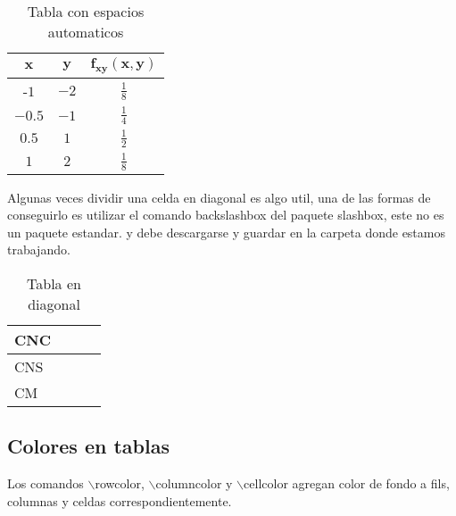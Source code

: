 \documentclass{article}
\begin{document}
	\renewcommand{\arrayrulewidth}{1pt}


	\begin{wraptable}[10]{L}[5mm]{0.4\textwidth}
		
		\centering
		\begin{tabular}{ccc}	%
			$\mathbf{x}$ & $\mathbf{y}$ & $\mathbf{f_{xy}(x,y)}$\\
			\hline %
			-$1$ & $-2$ & $\frac{1}{8}$\\
			$-0.5$ & $-1$ & $\frac{1}{4}$\\
			$0.5$ & $1$ & $\frac{1}{2}$ \\
			$1$ & $2$ & $\frac{1}{8}$\\
			\hline  
		\end{tabular}
		\caption{Tabla con espacios automaticos}
	\end{wraptable}
	\lipsum[2-1]
	Algunas veces dividir una celda en diagonal es algo util, una de las formas de conseguirlo es utilizar el comando \textcolor{myGreen}{backslashbox} del paquete \textcolor{myGreen}{slashbox}, este no es un paquete estandar. y debe descargarse y guardar en la carpeta donde estamos trabajando.

	\begin{table}[ht]
		\centering
		\begin{tabular}{|l||c|c|c|}
		\hline
		\hline \hline
		CNC & & & \\
		\hline
		CNS & & & \\
		\hline
		CM & & & \\
		\hline
		\end{tabular}
		\caption{Tabla en diagonal}
	\end{table}
	
	\subsection{Colores en tablas}
	Los comandos \textcolor{myGreen}{$\backslash$rowcolor}, \textcolor{myGreen}{$\backslash$columncolor} y \textcolor{myGreen}{$\backslash$cellcolor} agregan color de fondo a fils, columnas y celdas correspondientemente.\\
	
\end{document}
